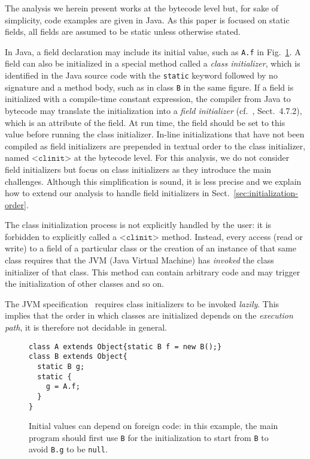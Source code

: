 \documentclass{entcs}
\newcommand{\clinit}{\ensuremath{\texttt{<clinit>}}}
\begin{document}
The analysis we herein present works at the bytecode level but, for
sake of simplicity, code examples are given in Java.  As this paper is
focused on static fields, all fields are assumed to be static unless
otherwise stated.

In Java, a field declaration may include its initial value, such as
\texttt{A.f} in Fig.~\ref{fig:depend_on_main}.  A field can also be
initialized in a special method called a \emph{class initializer},
which is identified in the Java source code with the \texttt{static}
keyword followed by no signature and a method body, such as in class
\texttt{B} in the same figure.
If a field is initialized with a compile-time constant expression, the
compiler from Java to bytecode may translate the initialization into a
\emph{field initializer} (cf.~\cite{lindholm99:jvm_spec},
Sect.~4.7.2), which is an attribute of the field.  At run time, the
field should be set to this value before running the class
initializer.
In-line initializations that have not been compiled as field
initializers are prepended in textual order to the class initializer,
named \clinit{} at the bytecode level.
For this analysis, we do not consider field initializers but focus on
class initializers as they introduce the main challenges.  Although
this simplification is sound, it is less precise and we explain how to
extend our analysis to handle field initializers in
Sect.~\ref{sec:initialization-order}.

The class initialization process is not explicitly handled by the
user: it is forbidden to explicitly called a \clinit{} method.
Instead, every access (read or write) to a field of a particular class
or the creation of an instance of that same class requires that the
JVM (Java Virtual Machine) has \emph{invoked} the class initializer
of that class.  This method can contain arbitrary code and may trigger
the initialization of other classes and so on.

The JVM specification~\cite{lindholm99:jvm_spec} requires class
initializers to be invoked \emph{lazily}.
This implies that the order in which classes are initialized depends
on the \emph{execution path}, it is therefore not decidable in
general.

\begin{figure}
  \begin{center}
\begin{lstlisting}
class A extends Object{static B f = new B();}
class B extends Object{
  static B g;
  static {
    g = A.f;
  }
}
\end{lstlisting}
  \end{center}
  \caption{Initial values can depend on foreign code: in this example,
    the main program should first use \texttt{B} for the
    initialization to start from \texttt{B} to avoid \texttt{B.g} to
    be \texttt{null}.}
  \label{fig:depend_on_main}
\end{figure}
\end{document}
